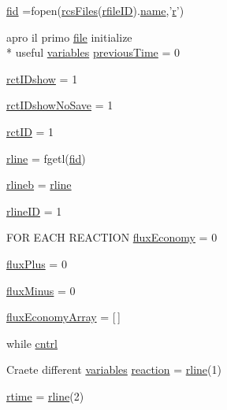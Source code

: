 \begin{DoxyCompactItemize}
\item 
\hyperlink{a00028_ae9011d40c6f13e68e6f07156e0da7c5d}{fid} =fopen(\hyperlink{a00028_aa7a414dad4901fc05688608a49adfd7e}{rcs\-Files}(\hyperlink{a00028_a2773ef160060ce8adead229154219112}{rfile\-I\-D}).\hyperlink{a00027_abbf559a76fab59203496b0847ab9502a}{name},'\hyperlink{a00031_ac862e7284527eb913b1351c8bfb8e079}{r}')
\item 
apro il primo \hyperlink{a00110_a4e8353d6c62cf54bf4a1a8f63e56b8c3}{file} initialize \\*
useful \hyperlink{a00037_a075795b83d470ba58980e465541f16e9}{variables} \hyperlink{a00028_a17b8652a085b5add031a40fb1c9a680e}{previous\-Time} = 0
\item 
\hyperlink{a00028_acfa9ac92c0e448faa531767d0e6ab194}{rct\-I\-Dshow} = 1
\item 
\hyperlink{a00028_aeb449dcc9eb8bfe0321b031e10962ac5}{rct\-I\-Dshow\-No\-Save} = 1
\item 
\hyperlink{a00028_acdd7317ca799b220a16028dcd54617a1}{rct\-I\-D} = 1
\item 
\hyperlink{a00028_a81318310a01613185f6a3e6183230bd0}{rline} = fgetl(\hyperlink{a00031_ae9011d40c6f13e68e6f07156e0da7c5d}{fid})
\item 
\hyperlink{a00028_a8df79027fd85d4a3668754f36e9e88c1}{rlineb} = \hyperlink{a00028_ab5b947e1a8b7cf496ffd4eb21317052e}{rline}
\item 
\hyperlink{a00028_a8443a49765859a8631fed7e8a1d27fe5}{rline\-I\-D} = 1
\item 
F\-O\-R E\-A\-C\-H R\-E\-A\-C\-T\-I\-O\-N \hyperlink{a00028_a8acf89849d5ed6a553d46d0e413773c5}{flux\-Economy} = 0
\item 
\hyperlink{a00028_a8fc578e8d997ae0f0e3063de3566646d}{flux\-Plus} = 0
\item 
\hyperlink{a00028_a3fea311ae703b9842f1429a370657f90}{flux\-Minus} = 0
\item 
\hyperlink{a00028_a5d3cba9db002e77eaf6ffce66592841f}{flux\-Economy\-Array} = \mbox{[}$\,$\mbox{]}
\item 
while \hyperlink{a00028_aae7c98255a05b6029bdfc5e96dc2ab88}{cntrl}
\item 
Craete different \hyperlink{a00037_a075795b83d470ba58980e465541f16e9}{variables} \hyperlink{a00028_a4ba2ecb46f808729569ecce2cc1d34c6}{reaction} = \hyperlink{a00028_ab5b947e1a8b7cf496ffd4eb21317052e}{rline}(1)
\item 
\hyperlink{a00028_afc6b38657a313b9f1de2ee356910b6ee}{rtime} = \hyperlink{a00028_ab5b947e1a8b7cf496ffd4eb21317052e}{rline}(2)
\item 

\end{DoxyCompactItemize}
